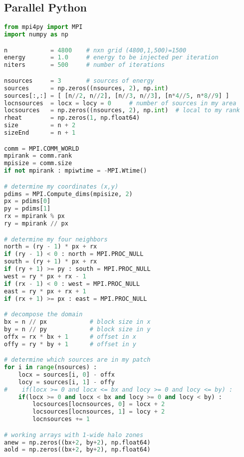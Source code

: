 \subsection{Parallel Python}
\begin{lstlisting}[language=Python, caption={Parallel Python implementation of the stencil test case.}]
from mpi4py import MPI
import numpy as np

n            = 4800    # nxn grid (4800,1,500)=1500
energy       = 1.0     # energy to be injected per iteration
niters       = 500     # number of iterations

nsources     = 3       # sources of energy
sources      = np.zeros((nsources, 2), np.int)
sources[:,:] = [ [n//2, n//2], [n//3, n//3], [n*4//5, n*8//9] ]
locnsources  = locx = locy = 0     # number of sources in my area
locsources   = np.zeros((nsources, 2), np.int)  # local to my rank
rheat        = np.zeros(1, np.float64)
size         = n + 2
sizeEnd      = n + 1

comm = MPI.COMM_WORLD
mpirank = comm.rank
mpisize = comm.size
if not mpirank : mpiwtime = -MPI.Wtime()

# determine my coordinates (x,y)
pdims = MPI.Compute_dims(mpisize, 2)
px = pdims[0]
py = pdims[1]
rx = mpirank % px
ry = mpirank // px

# determine my four neighbors
north = (ry - 1) * px + rx
if (ry - 1) < 0 : north = MPI.PROC_NULL
south = (ry + 1) * px + rx
if (ry + 1) >= py : south = MPI.PROC_NULL
west = ry * px + rx - 1
if (rx - 1) < 0 : west = MPI.PROC_NULL
east = ry * px + rx + 1
if (rx + 1) >= px : east = MPI.PROC_NULL

# decompose the domain   
bx = n // px            # block size in x
by = n // py            # block size in y
offx = rx * bx + 1      # offset in x
offy = ry * by + 1      # offset in y

# determine which sources are in my patch
for i in range(nsources) :
    locx = sources[i, 0] - offx
    locy = sources[i, 1] - offy
#    if(locx >= 0 and locx <= bx and locy >= 0 and locy <= by) :
    if(locx >= 0 and locx < bx and locy >= 0 and locy < by) :
        locsources[locnsources, 0] = locx + 2
        locsources[locnsources, 1] = locy + 2
        locnsources += 1

# working arrays with 1-wide halo zones
anew = np.zeros((bx+2, by+2), np.float64)
aold = np.zeros((bx+2, by+2), np.float64)


\end{lstlisting}
